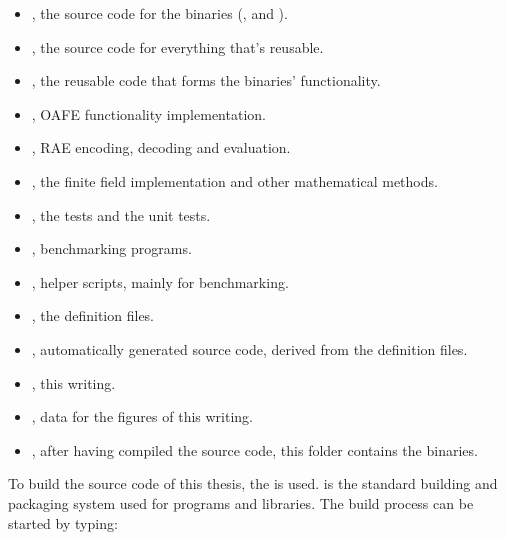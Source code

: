 \begin{itemize}

  \item {}, the source code for the binaries (\JWBpOne{},
    \JWBpTwo{} and \JWBtoken{}).

  \item {}, the source code for everything that's reusable.

  \item {}, the reusable code that forms the binaries'
    functionality.

  \item {}, OAFE functionality implementation.

  \item {}, RAE encoding, decoding and evaluation.

  \item {}, the finite field implementation and other
    mathematical methods.

  \item {}, the \JWTquickcheck{} tests and the unit tests.

  \item {}, benchmarking programs.

  \item {}, helper scripts, mainly for benchmarking.

  \item {}, the \JWTXprotobuf{} definition files.

  \item {}, automatically generated source code, derived from the
    \JWTprotobuf{} definition files.

  \item {}, this writing.

  \item {}, data for the figures of this writing.

  \item {}, after having compiled the source code, this folder
    contains the binaries.

\end{itemize}



To build the source code of this thesis, the \JWTLcabal{} is used. \JWTcabal{}
is the standard building and packaging system used for \JWThaskell{} programs
and libraries. The build process can be started by typing:


